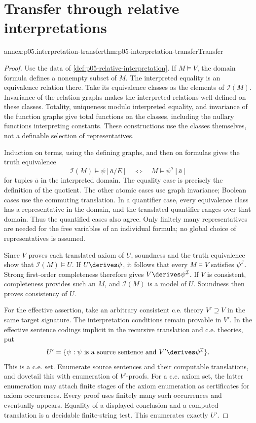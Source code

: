 \section{Transfer through relative interpretations}
\label{sec:annex-p05-interpretation-transfer}

\begin{annexitem}{annex:p05.interpretation-transfer}{thm:p05-interpretation-transfer}{Transfer}
\begin{proof}
Use the data of \cref{def:p05-relative-interpretation}. If \(M\models V\),
the domain formula defines a nonempty subset of \(M\). The interpreted
equality is an equivalence relation there. Take its equivalence classes
as the elements of \(\mathcal I(M)\). Invariance of the relation graphs
makes the interpreted relations well-defined on these classes.
Totality, uniqueness modulo interpreted equality, and invariance of
the function graphs give total functions on the classes, including
the nullary functions interpreting constants. These constructions use
the classes themselves, not a definable selection of representatives.

Induction on terms, using the defining graphs, and then on formulas
gives the truth equivalence
\[
 \mathcal I(M)\models\psi[\bar a/E]
 \quad\Longleftrightarrow\quad
 M\models\psi^{\mathcal I}[\bar a]
\]
for tuples \(\bar a\) in the interpreted domain. The equality case
is precisely the definition of the quotient. The other atomic cases
use graph invariance; Boolean cases use the commuting translation.
In a quantifier case, every equivalence class has a representative in
the domain, and the translated quantifier ranges over that domain.
Thus the quantified cases also agree. Only finitely many representatives
are needed for the free variables of an individual formula; no global
choice of representatives is assumed.

Since \(V\) proves each translated axiom of \(U\), soundness and the
truth equivalence show that \(\mathcal I(M)\models U\). If
\(U\derives\psi\), it follows that every \(M\models V\) satisfies
\(\psi^{\mathcal I}\). Strong first-order completeness therefore gives
\(V\derives\psi^{\mathcal I}\). If \(V\) is consistent, completeness
provides such an \(M\), and \(\mathcal I(M)\) is a model of \(U\).
Soundness then proves consistency of \(U\).

For the effective assertion, take an arbitrary consistent c.e. theory
\(V'\supseteq V\) in the same target signature. The interpretation
conditions remain provable in \(V'\). In the effective sentence codings
implicit in the recursive translation and c.e. theories, put
\[
 U' = \{\psi:\psi\text{ is a source sentence and }
                         V'\derives\psi^{\mathcal I}\}.
\]
This is a c.e. set. Enumerate source sentences and their computable
translations, and dovetail this with enumeration of \(V'\)-proofs.
For a c.e. axiom set, the latter enumeration may attach finite stages
of the axiom enumeration as certificates for axiom occurrences.
Every proof uses finitely many such occurrences and eventually appears.
Equality of a displayed conclusion and a computed translation is a
decidable finite-string test. This enumerates exactly \(U'\).


\end{proof}
\end{annexitem}
